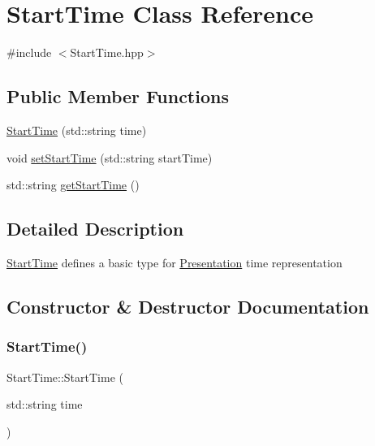 \hypertarget{class_start_time}{}\section{Start\+Time Class Reference}
\label{class_start_time}


{\ttfamily \#include $<$Start\+Time.\+hpp$>$}

\subsection*{Public Member Functions}
\begin{DoxyCompactItemize}
\item 
\mbox{\hyperlink{class_start_time_ad8209b406c1bd41cd5b71911181b9162}{Start\+Time}} (std\+::string time)
\item 
void \mbox{\hyperlink{class_start_time_ad6692d66a7c97d3a58f6d7b5b56880bc}{set\+Start\+Time}} (std\+::string start\+Time)
\item 
std\+::string \mbox{\hyperlink{class_start_time_a0a58ef81a90d0f58a7957e49dfa88684}{get\+Start\+Time}} ()
\end{DoxyCompactItemize}


\subsection{Detailed Description}
\mbox{\hyperlink{class_start_time}{Start\+Time}} defines a basic type for \mbox{\hyperlink{class_presentation}{Presentation}} time representation 

\subsection{Constructor \& Destructor Documentation}
\mbox{\label{class_start_time_ad8209b406c1bd41cd5b71911181b9162}} 
\subsubsection{\texorpdfstring{StartTime()}{StartTime()}}
{\footnotesize\ttfamily Start\+Time\+::\+Start\+Time (\begin{DoxyParamCaption}\item[{std\+::string}]{time }\end{DoxyParamCaption})}



